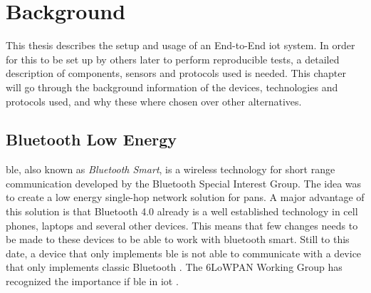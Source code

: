 \chapter{Background}
\label{chp:background} 

This thesis describes the setup and usage of an End-to-End \gls{iot} system. In order for this to be set up by others later to perform reproducible tests, a detailed description of components, sensors and protocols used is needed. This chapter will go through the background information of the devices, technologies and protocols used, and why these where chosen over other alternatives. 







\section{Bluetooth Low Energy}


\gls{ble}, also known as \textit{Bluetooth Smart}, is a wireless technology for short range communication developed by the Bluetooth Special Interest Group. The idea was to create a low energy single-hop network solution for \glspl{pan}. A major advantage of this solution is that Bluetooth 4.0 already is a well established technology in cell phones, laptops and several other devices. This means that few changes needs to be made to these devices to be able to work with bluetooth smart. Still to this date, a device that only implements \gls{ble} is not able to communicate with a device that only implements classic Bluetooth \cite{gomez2012overview}.
The 6LoWPAN Working Group has recognized the importance if \gls{ble} in \gls{iot} \cite{hui2008extending} .

